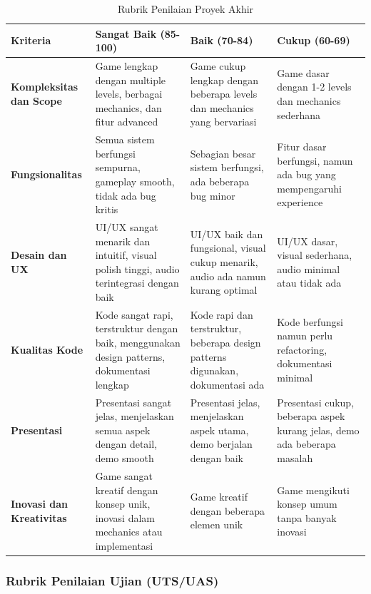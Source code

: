 \documentclass[a4paper,12pt]{article}
\begin{document}
\begin{table}[h]
\centering
\caption{Rubrik Penilaian Proyek Akhir}
\label{tab:rubrik_proyek}
\small
\begin{tabular}{|p{2cm}|p{3.5cm}|p{3.5cm}|p{3.5cm}|}
\hline
\textbf{Kriteria} & \textbf{Sangat Baik (85-100)} & \textbf{Baik (70-84)} & \textbf{Cukup (60-69)} \\
\hline
\textbf{Kompleksitas dan Scope} & Game lengkap dengan multiple levels, berbagai mechanics, dan fitur advanced & Game cukup lengkap dengan beberapa levels dan mechanics yang bervariasi & Game dasar dengan 1-2 levels dan mechanics sederhana \\
\hline
\textbf{Fungsionalitas} & Semua sistem berfungsi sempurna, gameplay smooth, tidak ada bug kritis & Sebagian besar sistem berfungsi, ada beberapa bug minor & Fitur dasar berfungsi, namun ada bug yang mempengaruhi experience \\
\hline
\textbf{Desain dan UX} & UI/UX sangat menarik dan intuitif, visual polish tinggi, audio terintegrasi dengan baik & UI/UX baik dan fungsional, visual cukup menarik, audio ada namun kurang optimal & UI/UX dasar, visual sederhana, audio minimal atau tidak ada \\
\hline
\textbf{Kualitas Kode} & Kode sangat rapi, terstruktur dengan baik, menggunakan design patterns, dokumentasi lengkap & Kode rapi dan terstruktur, beberapa design patterns digunakan, dokumentasi ada & Kode berfungsi namun perlu refactoring, dokumentasi minimal \\
\hline
\textbf{Presentasi} & Presentasi sangat jelas, menjelaskan semua aspek dengan detail, demo smooth & Presentasi jelas, menjelaskan aspek utama, demo berjalan dengan baik & Presentasi cukup, beberapa aspek kurang jelas, demo ada beberapa masalah \\
\hline
\textbf{Inovasi dan Kreativitas} & Game sangat kreatif dengan konsep unik, inovasi dalam mechanics atau implementasi & Game kreatif dengan beberapa elemen unik & Game mengikuti konsep umum tanpa banyak inovasi \\
\hline
\end{tabular}
\end{table}

\subsubsection{Rubrik Penilaian Ujian (UTS/UAS)}
\end{document}
